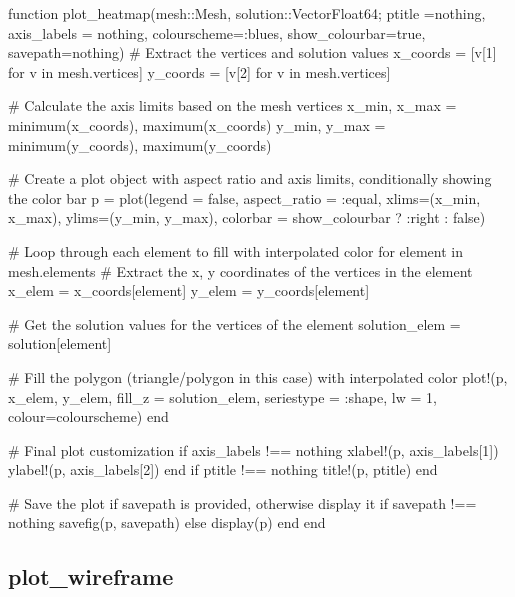 \documentclass{report}
\begin{document}
\begin{jllisting}[style=JuliaStyle]
function plot_heatmap(mesh::Mesh, solution::Vector{Float64}; ptitle =nothing, axis_labels = nothing, colourscheme=:blues, show_colourbar=true, savepath=nothing)
    # Extract the vertices and solution values
    x_coords = [v[1] for v in mesh.vertices]
    y_coords = [v[2] for v in mesh.vertices]

    # Calculate the axis limits based on the mesh vertices
    x_min, x_max = minimum(x_coords), maximum(x_coords)
    y_min, y_max = minimum(y_coords), maximum(y_coords)

    # Create a plot object with aspect ratio and axis limits, conditionally showing the color bar
    p = plot(legend = false, aspect_ratio = :equal, xlims=(x_min, x_max), ylims=(y_min, y_max), 
             colorbar = show_colourbar ? :right : false)

    # Loop through each element to fill with interpolated color
    for element in mesh.elements
        # Extract the x, y coordinates of the vertices in the element
        x_elem = x_coords[element]
        y_elem = y_coords[element]
        
        # Get the solution values for the vertices of the element
        solution_elem = solution[element]

        # Fill the polygon (triangle/polygon in this case) with interpolated color
        plot!(p, x_elem, y_elem, fill_z = solution_elem, seriestype = :shape, lw = 1, colour=colourscheme)
    end

    # Final plot customization
    if axis_labels !== nothing
        xlabel!(p, axis_labels[1])
        ylabel!(p, axis_labels[2])
    end
    if ptitle !== nothing
        title!(p, ptitle)
    end


    # Save the plot if savepath is provided, otherwise display it
    if savepath !== nothing
        savefig(p, savepath)
    else
        display(p)
    end
end
\end{jllisting}

\subsection{plot\_wireframe}
\end{document}

